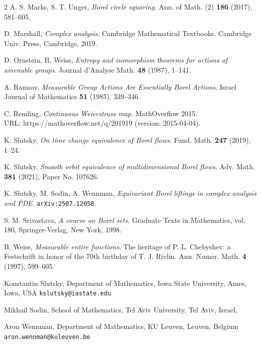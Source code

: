 \documentclass[11pt]{paper}
\begin{document}
\begin{thebibliography}{2}
 A. S. Marks, S. T. Unger,
{\em Borel circle squaring}. Ann. of Math. (2) {\bf 186} (2017), 581--605.

 D. Marshall, {\em Complex analysis}.
Cambridge Mathematical Textbooks. Cambridge Univ. Press, Cambridge, 2019.

 D. Ornstein, B. Weiss,
{\em Entropy and isomorphism theorems for actions of
amenable groups}. Journal d'Analyse Math. {\bf 48} (1987), 1--141.

 A. Ramsay, {\em Measurable Group Actions Are Essentially Borel Actions}.
Israel Journal of Mathematics {\bf 51} (1985), 339--346.

 C. Remling,
{\em Continuous Weierstrass map}. MathOverflow 2015. \\
URL: https://mathoverflow.net/q/201919 (version: 2015-04-04).

 K. Slutsky,
{\em On time change equivalence of Borel flows}. Fund. Math. {\bf 247} (2019),  1--24.

 K. Slutsky,
{\em Smooth orbit equivalence of multidimensional Borel flows}.
Adv. Math. {\bf 381} (2021), Paper No. 107626.

 K. Slutsky, M. Sodin, A. Wennman,
{\em Equivariant Borel liftings in complex analysis and PDE}.
{\tt    arXiv:2507.12058}.

 S. M. Srivastava, {\em A course on Borel sets}.
Graduate Texts in Mathematics, vol. 180, Springer-Verlag, New York, 1998.

 B. Weiss,
{\em Measurable entire functions}.
The heritage of P. L. Chebyshev: a Festschrift in honor of the 70th birthday of T. J. Rivlin.
Ann. Numer. Math. {\bf 4} (1997), 599--605.
\end{thebibliography}

\bigskip
\medskip

\noindent Konstantin Slutsky, Department of Mathematics, Iowa State University, Ames, Iowa, USA \newline
{\tt kslutsky@iastate.edu}

\medskip\noindent Mikhail Sodin,
School of Mathematics, Tel Aviv University, Tel Aviv, Israel,

\medskip\noindent Aron Wennman, Department of Mathematics, KU Leuven, Leuven, Belgium \newline
{\tt aron.wennman@kuleuven.be}
\end{document}

